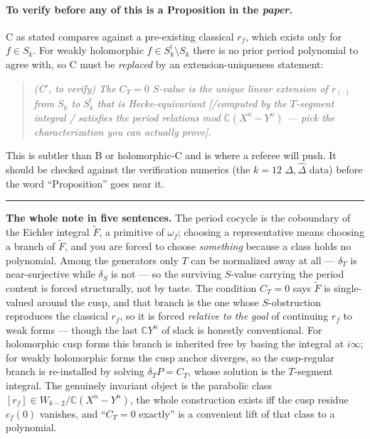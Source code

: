 \documentclass[11pt]{article}
\newcommand{\CC}{\mathbb{C}}
\newcommand{\Eich}{\widetilde{F}}
\begin{document}
\paragraph{To verify before any of this is a Proposition in the
\emph{paper}.} C as stated compares against a pre-existing classical
$r_f$, which exists only for $f \in S_k$. For weakly holomorphic
$f \in S^!_k \setminus S_k$ there is no prior period polynomial to agree
with, so C must be \emph{replaced} by an extension-uniqueness statement:
\begin{quote}\itshape
(C$'$, to verify) The $C_T = 0$ $S$-value is the unique linear extension
of $r_{(\cdot)}$ from $S_k$ to $S^!_k$ that is Hecke-equivariant
[/computed by the $T$-segment integral / satisfies the period relations
mod $\CC(X^n-Y^n)$ --- pick the characterization you can actually prove].
\end{quote}
This is subtler than B or holomorphic-C and is where a referee will push.
It should be checked against the verification numerics (the $k = 12$
$\Delta, \widehat\Delta$ data) before the word ``Proposition'' goes near
it.

\bigskip
\hrule
\bigskip

\noindent\textbf{The whole note in five sentences.}
The period cocycle is the coboundary of the Eichler integral $\Eich$, a
primitive of $\omega_f$; choosing a representative means choosing a branch
of $\Eich$, and you are forced to choose \emph{something} because a class
holds no polynomial. Among the generators only $T$ can be normalized away
at all --- $\delta_T$ is near-surjective while $\delta_S$ is not --- so
the surviving $S$-value carrying the period content is forced
structurally, not by taste. The condition $C_T = 0$ says $\Eich$ is
single-valued around the cusp, and that branch is the one whose
$S$-obstruction reproduces the classical $r_f$, so it is forced
\emph{relative to the goal} of continuing $r_f$ to weak forms --- though
the last $\CC Y^n$ of slack is honestly conventional. For holomorphic
cusp forms this branch is inherited free by basing the integral at
$i\infty$; for weakly holomorphic forms the cusp anchor diverges, so the
cusp-regular branch is re-installed by solving $\delta_T P = C_T$, whose
solution is the $T$-segment integral. The genuinely invariant object is
the parabolic class $[r_f] \in W_{k-2}/\CC(X^n - Y^n)$, the whole
construction exists iff the cusp residue $c_f(0)$ vanishes, and
``$C_T = 0$ exactly'' is a convenient lift of that class to a polynomial.
\end{document}
